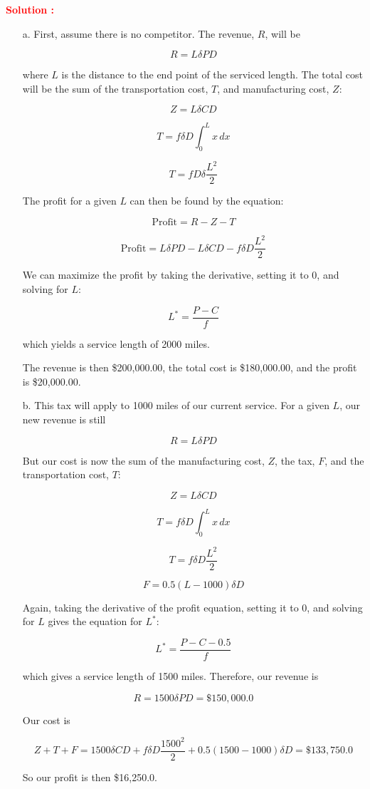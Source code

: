 \documentclass[12pt]{article}
\begin{document}
\textbf{\textcolor{red}{Solution :}} 

\begin{itemize}
    \item [a.] First, assume there is no competitor. The revenue, \(R\), will be

\[
R = L\delta PD
\]

where \(L\) is the distance to the end point of the serviced length. The total cost will be the sum of the transportation cost, \(T\), and manufacturing cost, \(Z\):

\[
Z = L\delta CD
\]

\[
T = f \delta D \int_0^L x \, dx
\]

\[
T = fD \delta \frac{L^2}{2}
\]

The profit for a given \(L\) can then be found by the equation:

\[
\text{Profit} = R - Z - T
\]

\[
\text{Profit} = L\delta PD - L\delta CD - f\delta D \frac{L^2}{2}
\]

We can maximize the profit by taking the derivative, setting it to 0, and solving for \(L\):

\[
L^* = \frac{P - C}{f}
\]

which yields a service length of 2000 miles.

The revenue is then \$200,000.00, the total cost is \$180,000.00, and the profit is \$20,000.00.


    \item [b.] This tax will apply to 1000 miles of our current service. For a given \(L\), our new revenue is still 

\[
R = L\delta PD
\]

But our cost is now the sum of the manufacturing cost, \(Z\), the tax, \(F\), and the transportation cost, \(T\):

\[
Z = L\delta CD
\]

\[
T = f\delta D \int_0^L x \, dx
\]

\[
T = f\delta D \frac{L^2}{2}
\]

\[
F = 0.5 (L - 1000)\delta D
\]

Again, taking the derivative of the profit equation, setting it to 0, and solving for \(L\) gives the equation for \(L^*\):

\[
L^* = \frac{P - C - 0.5}{f}
\]

which gives a service length of 1500 miles. Therefore, our revenue is 

\[
R = 1500\delta PD = \$150,000.0
\]

Our cost is 

\[
Z + T + F = 1500\delta CD + f\delta D \frac{1500^2}{2} + 0.5 (1500 - 1000)\delta D = \$133,750.0
\]

So our profit is then \$16,250.0.

\end{itemize}
\end{document}
